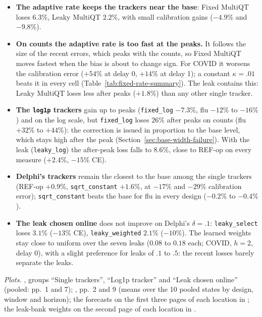 \documentclass[11pt,a4paper]{article}
\theoremstyle{definition}
\theoremstyle{remark}
\begin{document}
\begin{itemize}[leftmargin=*,itemsep=3pt]
\item \textbf{The adaptive rate keeps the trackers near the base}: Fixed
MultiQT loses $6.3\%$, Leaky MultiQT $2.2\%$, with small calibration gains
($-4.9\%$ and $-9.8\%$).
\item \textbf{On counts the adaptive rate is too fast at the peaks.} It
follows the size of the recent errors, which peaks with the counts, so
Fixed MultiQT moves fastest when the bias is about to change sign. For
COVID it worsens the calibration error ($+54\%$ at delay 0, $+14\%$ at
delay 1); a constant $\kappa=.01$ beats it in every cell
(Table~\ref{tab:fixed-rate-summary}). The leak contains this: Leaky
MultiQT loses less after peaks ($+1.8\%$) than any other single tracker.
\item \textbf{The \texttt{log1p} trackers} gain up to peaks
(\texttt{fixed\_log} $-7.3\%$, flu $-12\%$ to $-16\%$) and on the log scale,
but \texttt{fixed\_log} loses $26\%$ after peaks on counts (flu $+32\%$ to
$+44\%$): the correction is issued in proportion to the base level, which
stays high after the peak (Section~\ref{sec:base-width-failure}). With the
leak (\texttt{leaky\_log}) the after-peak loss falls to $8.6\%$, close to
REF-op on every measure ($+2.4\%$, $-15\%$ CE).
\item \textbf{Delphi's trackers} remain the closest to the base among the
single trackers (REF-op $+0.9\%$, \texttt{sqrt\_constant} $+1.6\%$, at
$-17\%$ and $-29\%$ calibration error); \texttt{sqrt\_constant} beats the
base for flu in every design ($-0.2\%$ to $-0.4\%$).
\item \textbf{The leak chosen online} does not improve on Delphi's
$\delta=.1$: \texttt{leaky\_select} loses $3.1\%$ ($-13\%$ CE),
\texttt{leaky\_weighted} $2.1\%$ ($-10\%$). The learned weights stay close
to uniform over the seven leaks ($0.08$ to $0.18$ each; COVID, $h=2$,
delay 0), with a slight preference for leaks of $.1$ to $.5$: the recent
losses barely separate the leaks.
\end{itemize}
\emph{Plots.} , groups ``Single trackers'',
``Log1p tracker'' and ``Leak chosen online'' (pooled: pp.~1 and 7);
, pp.~2 and 9 (means over the
10 pooled states by design, window and horizon); the forecasts on the
first three pages of each location in ;
the leak-bank weights on the second page of each location in
.
\end{document}
